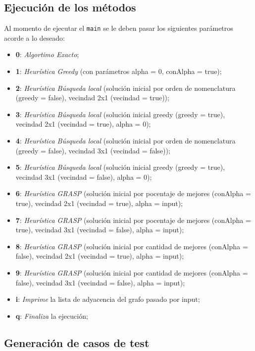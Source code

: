 \documentclass[a4paper]{article}
\begin{document}
\subsection{Ejecuci\'on de los m\'etodos}

Al momento de ejecutar el \texttt{main} se le deben pasar los siguientes par\'ametros acorde a lo deseado:

\begin{itemize}
\item \textbf{0}: \emph{Algortimo Exacto};
\item \textbf{1}: \emph{Heur\'istica Greedy} (con par\'ametros alpha = 0, conAlpha = true);
\item \textbf{2}: \emph{Heur\'istica B\'usqueda local} (soluci\'on inicial por orden de nomenclatura (greedy = false), vecindad 2x1 (vecindad = true));
\item \textbf{3}: \emph{Heur\'istica B\'usqueda local} (soluci\'on inicial greedy (greedy = true), vecindad 2x1 (vecindad = true), alpha = 0);
\item \textbf{4}: \emph{Heur\'istica B\'usqueda local} (soluci\'on inicial por orden de nomenclatura (greedy = false), vecindad 3x1 (vecindad = false));
\item \textbf{5}: \emph{Heur\'istica B\'usqueda local} (soluci\'on inicial greedy (greedy = true), vecindad 3x1 (vecindad = false), alpha = 0);
\item \textbf{6}: \emph{Heur\'istica GRASP} (soluci\'on inicial por pocentaje de mejores (conAlpha = true), vecindad 2x1 (vecindad = true), alpha = input);
\item \textbf{7}:\emph{ Heur\'istica GRASP} (soluci\'on inicial por pocentaje de mejores (conAlpha = true), vecindad 3x1 (vecindad = false), alpha = input);
\item \textbf{8}:\emph{ Heur\'istica GRASP }(soluci\'on inicial por cantidad de mejores (conAlpha = false), vecindad 2x1 (vecindad = true), alpha = input);
\item \textbf{9}: \emph{Heur\'istica GRASP} (soluci\'on inicial por cantidad de mejores (conAlpha = false), vecindad 3x1 (vecindad = false), alpha = input);
\item \textbf{i}: \emph{Imprime} la lista de adyacencia del grafo pasado por input;
\item \textbf{q}: \emph{Finaliza} la ejecuci\'on;
\end{itemize}

\subsection{Generaci\'on de casos de test}\label{instacegen}
\end{document}
